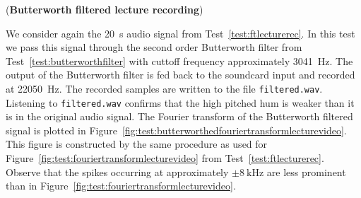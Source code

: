 \begin{randomfloat}[p]
\begin{test}\label{test:butterworthfilteredlecturerec}
(\textbf{Butterworth filtered lecture recording})

We consider again the \SI{20}{\second} audio signal from Test~\ref{test:ftlecturerec}.  In this test we pass this signal through the second order Butterworth filter from Test~\ref{test:butterworthfilter} with cuttoff frequency approximately \SI{3041}{\hertz}.  The output of the Butterworth filter is fed back to the soundcard input and recorded at \SI{22050}{\hertz}.  The recorded samples are written to the file \texttt{filtered.wav}.  Listening to \texttt{filtered.wav} confirms that the high pitched hum is weaker than it is in the original audio signal.  The Fourier transform of the Butterworth filtered signal is plotted in Figure~\ref{fig:test:butterworthedfouriertransformlecturevideo}.  This figure is constructed by the same procedure as used for Figure~\ref{fig:test:fouriertransformlecturevideo} from Test~\ref{test:ftlecturerec}.  Observe that the spikes occurring at approximately $\pm\SI{8}{\kilo\hertz}$ are less prominent than in Figure~\ref{fig:test:fouriertransformlecturevideo}.

\begin{center}
\label{fig:test:butterworthedfouriertransformlecturevideo}
\end{center}

\end{test}
\end{randomfloat}

